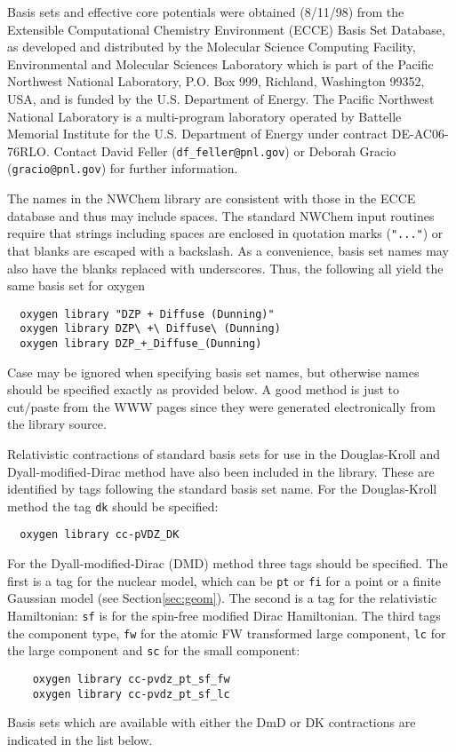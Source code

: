 \label{sec:knownbasis}

Basis sets and effective core potentials were obtained (8/11/98) from
the Extensible Computational Chemistry Environment (ECCE) Basis Set
Database, as developed and distributed by the Molecular Science
Computing Facility, Environmental and Molecular Sciences Laboratory
which is part of the Pacific Northwest National Laboratory, P.O. Box
999, Richland, Washington 99352, USA, and is funded by the
U.S. Department of Energy.  The Pacific Northwest National Laboratory
is a multi-program laboratory operated by Battelle Memorial Institute
for the U.S. Department of Energy under contract DE-AC06-76RLO.
Contact David Feller (\verb+df_feller@pnl.gov+) or Deborah Gracio
(\verb+gracio@pnl.gov+) for further information.

The names in the NWChem library are consistent with those in the ECCE
database and thus may include spaces.  The standard NWChem input
routines require that strings including spaces are enclosed in
quotation marks (\verb+"..."+) or that blanks are escaped with a
backslash.  As a convenience, basis set names may also have the blanks
replaced with underscores.  Thus, the following all yield the same
basis set for oxygen
\begin{verbatim}
  oxygen library "DZP + Diffuse (Dunning)"
  oxygen library DZP\ +\ Diffuse\ (Dunning)
  oxygen library DZP_+_Diffuse_(Dunning)
\end{verbatim}

Case may be ignored when specifying basis set names, but otherwise
names should be specified exactly as provided below.  A good method is
just to cut/paste from the WWW pages since they were generated
electronically from the library source.

Relativistic contractions of standard basis sets for use in the Douglas-Kroll 
and Dyall-modified-Dirac method have also been included in the library. These
are identified by tags following the standard basis set name.  \newline
For the Douglas-Kroll method the tag \verb+dk+ should be specified: 
\begin{verbatim}
  oxygen library cc-pVDZ_DK
\end {verbatim}
For the Dyall-modified-Dirac (DMD) method three tags should be specified. The 
first is a tag for the nuclear model, which can be \verb+pt+ or \verb+fi+ for 
a point or a finite Gaussian model (see Section\ref{sec:geom}).  The second 
is a tag for the relativistic Hamiltonian: \verb+sf+ is for the spin-free 
modified Dirac Hamiltonian. The third tags the component type, \verb+fw+ for 
the atomic FW transformed large component, \verb+lc+ for the large component 
and \verb+sc+ for the small component: 
\begin{verbatim}
    oxygen library cc-pvdz_pt_sf_fw
    oxygen library cc-pvdz_pt_sf_lc
\end{verbatim} 
Basis sets which are available with either the DmD or DK contractions are
indicated in the list below.

